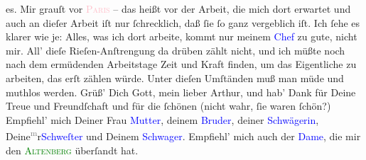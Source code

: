                es.\pend
           \pstart
           Mir grauſt vor \textsc{\textcolor{pink}{Paris}{}\ledrightnote{\textcolor{pink}{Paris}}} – das heißt vor der Arbeit, die  mich {\pb}dort erwartet und auch an dieſer Arbeit iſt nur
               ſchrecklich, daß ſie ſo ganz vergeblich iſt. Ich ſehe es \strikeout{\textcolor{gray}{×}} klarer wie je: Alles, was ich dort arbeite, kommt nur meinem \textcolor{blue}{Chef}{} zu gute, nicht mir. All’ dieſe
               Rieſen-Anſtrengung da drüben zählt nicht, und ich müßte \strikeout{\textcolor{gray}{×}\-\textcolor{gray}{×}\-\textcolor{gray}{×}\textcolor{gray}{h}} noch nach dem ermüdenden Arbeitstage Zeit und Kraft finden, um das Eigentliche
               zu arbeiten, das erſt zählen würde. Unter {\pb}dieſen
               Umſtänden muß man müde und muthlos werden.\pend
           \pstart
           Grüß’ Dich Gott, mein lieber Arthur, und hab’ Dank für Deine Treue und Freundſchaft
               und für die ſchönen \label{K_L02784-13v}\label{K_L02784-13h} (nicht wahr, ſie waren ſchön?)\pend
           \pstart
           Empfiehl’ mich Deiner Frau \textcolor{blue}{Mutter}{}, deinem \textcolor{blue}{Bruder}{}, deiner \textcolor{blue}{Schwägerin}{}, Deine\substVorne{}\textsuperscript{\textcolor{gray}{m}}\substDazwischen{}r\substHinten{}{ }\textcolor{blue}{Schweſter}{} und {\pb}Deinem \textcolor{blue}{Schwager}{}.\pend
           \pstart
           Empfiehl’ mich auch der \textcolor{blue}{Dame}{}, die mir den \textsc{\textcolor{blue}{\textcolor{green}{Altenberg}{}}{}\ledrightnote{\textcolor{blue}{Peter Altenberg}}} überſandt hat.\pend
